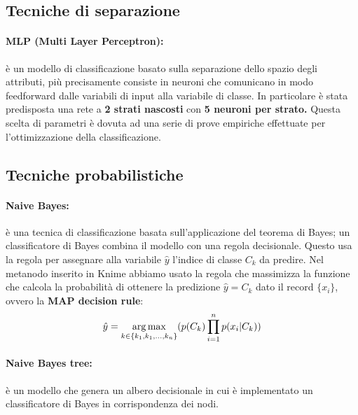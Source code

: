 \subsection{Tecniche di separazione}

\paragraph{MLP (Multi Layer Perceptron):} è un modello di classificazione basato sulla separazione dello spazio degli attributi, più precisamente consiste in neuroni che comunicano in modo feedforward dalle variabili di input alla variabile di classe. In particolare è stata predisposta una rete a \textbf{2 strati nascosti} con \textbf{5 neuroni per strato.} Questa scelta di parametri è dovuta ad una serie di prove empiriche effettuate per l'ottimizzazione della classificazione. 

\subsection{Tecniche probabilistiche}

\paragraph{Naive Bayes:} è una tecnica di classificazione basata sull'applicazione del teorema di Bayes; un classificatore di  Bayes combina il modello con una regola decisionale. Questo usa la regola per assegnare  alla variabile $\hat{y}$ l'indice di classe $C_k$ da predire. Nel metanodo inserito in Knime abbiamo usato la regola che massimizza la funzione che calcola la probabilità di ottenere la predizione $\hat{y}=C_k$ dato il record $\{x_i\}$, ovvero la \textbf{MAP decision rule}: 
\[\hat{y} = \operatorname*{arg\,max}_{k \in \{k_1, k_1,...,k_n\}} (p(C_k)\prod\limits_{i = 1}^{n}p(x_i|C_k)) \]
\paragraph{Naive Bayes tree:} è un modello che genera un albero decisionale in cui è implementato un classificatore di Bayes in corrispondenza dei nodi.
